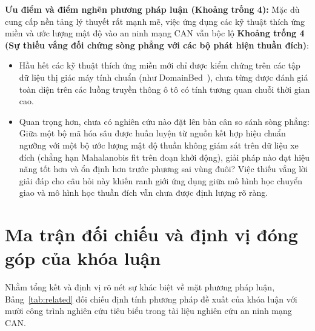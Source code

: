 \documentclass[12pt, a4paper, reqno, oneside]{book}
\begin{document}
\textbf{Ưu điểm và điểm nghẽn phương pháp luận (Khoảng trống 4):}
Mặc dù cung cấp nền tảng lý thuyết rất mạnh mẽ, việc ứng dụng các kỹ thuật thích ứng miền và ước lượng mật độ vào an ninh mạng CAN vẫn bộc lộ \textbf{Khoảng trống 4 (Sự thiếu vắng đối chứng sòng phẳng với các bộ phát hiện thuần đích)}:
\begin{itemize}
    \item Hầu hết các kỹ thuật thích ứng miền mới chỉ được kiểm chứng trên các tập dữ liệu thị giác máy tính chuẩn (như DomainBed~\cite{gulrajani2021domainbed}), chưa từng được đánh giá toàn diện trên các luồng truyền thông ô tô có tính tương quan chuỗi thời gian cao.
    \item Quan trọng hơn, chưa có nghiên cứu nào đặt lên bàn cân so sánh sòng phẳng: Giữa một bộ mã hóa sâu được huấn luyện từ nguồn kết hợp hiệu chuẩn ngưỡng với một bộ ước lượng mật độ thuần không giám sát trên dữ liệu xe đích (chẳng hạn Mahalanobis fit trên đoạn khởi động), giải pháp nào đạt hiệu năng tốt hơn và ổn định hơn trước phương sai vùng đuôi? Việc thiếu vắng lời giải đáp cho câu hỏi này khiến ranh giới ứng dụng giữa mô hình học chuyển giao và mô hình học thuần đích vẫn chưa được định lượng rõ ràng.
\end{itemize}

\section{Ma trận đối chiếu và định vị đóng góp của khóa luận}
Nhằm tổng kết và định vị rõ nét sự khác biệt về mặt phương pháp luận, Bảng~\ref{tab:related} đối chiếu định tính phương pháp đề xuất của khóa luận với mười công trình nghiên cứu tiêu biểu trong tài liệu nghiên cứu an ninh mạng CAN.
\end{document}
